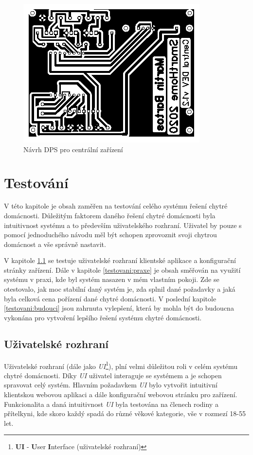 \begin{figure}[hbt]
  \centering
  \includegraphics[width=0.6 \linewidth]{obrazky-figures/pcb.png}
  \caption{Návrh DPS pro centrální zařízení}
  \label{figure:schema}
\end{figure}

\chapter{Testování}
\label{testovani}
V této kapitole je obsah zaměřen na testování celého systému řešení chytré domácnosti.
Důležitým faktorem daného řešení chytré domácnosti byla intuitivnost systému a to především uživatelského rozhraní.
Uživatel by pouze s pomocí jednoduchého návodu měl být schopen zprovoznit svoji chytrou domácnost a vše správně nastavit.

V kapitole \ref{testovani:UI} se testuje uživatelské rozhraní klientské aplikace a konfigurační stránky zařízení.
Dále v kapitole \ref{testovani:praxe} je obsah směřován na využití systému v praxi, kde byl systém nasazen v mém vlastním pokoji.
Zde se otestovalo, jak moc stabilní daný systém je, zda splnil dané požadavky a jaká byla celková cena pořízení dané chytré domácnosti.
V poslední kapitole \ref{testovani:budouci} jsou zahrnuta vylepšení, která by mohla být do budoucna vykonána pro vytvoření lepšího řešení systému chytré domácnosti.

\section{Uživatelské rozhraní}
\label{testovani:UI}
Uživatelské rozhraní (dále jako \emph{UI}\footnote{\textbf{UI} - \textbf{U}ser \textbf{I}nterface (uživatelské rozhraní)}), plní velmi důležitou roli v celém systému chytré domácnosti.
Díky \emph{UI} uživatel interaguje se systémem a je schopen spravovat celý systém.
Hlavním požadavkem \emph{UI} bylo vytvořit intuitivní klientskou webovou aplikaci a dále konfigurační webovou stránku pro zařízení.
Funkcionalita a daná intuitivnost \emph{UI} byla testována na členech rodiny a přítelkyni, kde skoro každý spadá do různé věkové kategorie, vše v rozmezí 18-55 let.

